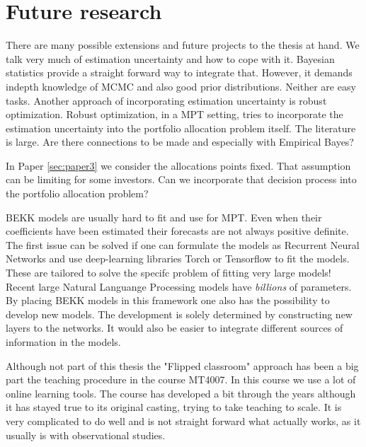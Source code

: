 \documentclass[]{book}\usepackage{knitr}
\begin{document}
\chapter{Future research}\label{ch:future}


There are many possible extensions and future projects to the thesis at hand. We talk very much of estimation uncertainty and how to cope with it.
Bayesian statistics provide a straight forward way to integrate that. 
However, it demands indepth knowledge of MCMC and also good prior distributions.
Neither are easy tasks.
Another approach of incorporating estimation uncertainty is robust optimization.
Robust optimization, in a MPT setting, tries to incorporate the estimation uncertainty into the portfolio allocation problem itself.
The literature is large. 
Are there connections to be made and especially with Empirical Bayes?

In Paper \ref{sec:paper3} we consider the allocations points fixed.
That assumption can be limiting for some investors. 
Can we incorporate that decision process into the portfolio allocation problem?

BEKK models are usually hard to fit and use for MPT. 
Even when their coefficients have been estimated their forecasts are not always positive definite. 
The first issue can be solved if one can formulate the models as Recurrent Neural Networks and use deep-learning libraries Torch or Tensorflow to fit the models. 
These are tailored to solve the specifc problem of fitting very large models! Recent large Natural Languange Processing models have \textit{billions} of parameters. 
By placing BEKK models in this framework one also has the possibility to develop new models. 
The development is solely determined by constructing new layers to the networks. 
It would also be easier to integrate different sources of information in the models.

Although not part of this thesis the "Flipped classroom" approach has been a big part the teaching procedure in the course MT4007. 
In this course we use a lot of online learning tools. 
The course has developed a bit through the years although it has stayed true to its original casting, trying to take teaching to scale. 
It is very complicated to do well and is not straight forward what actually works, as it usually is with observational studies. 

\printbibliography
%

\end{document}
